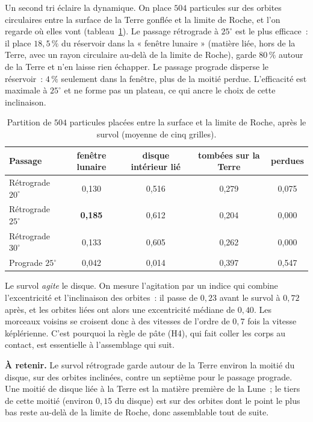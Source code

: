\documentclass[11pt,a4paper]{article}
\begin{document}
Un second tri éclaire la dynamique. On place $504$ particules sur des orbites circulaires entre la surface de la Terre gonflée et la limite de Roche, et l'on regarde où elles vont (tableau~\ref{tab:504}). Le passage rétrograde à $25^\circ$ est le plus efficace~: il place $18{,}5\,\%$ du réservoir dans la « fenêtre lunaire » (matière liée, hors de la Terre, avec un rayon circulaire au-delà de la limite de Roche), garde $80\,\%$ autour de la Terre et n'en laisse rien échapper. Le passage prograde disperse le réservoir~: $4\,\%$ seulement dans la fenêtre, plus de la moitié perdue. L'efficacité est maximale à $25^\circ$ et ne forme pas un plateau, ce qui ancre le choix de cette inclinaison.

\begin{table}[htbp]
\centering
\caption{Partition de $504$ particules placées entre la surface et la limite de Roche, après le survol (moyenne de cinq grilles).\label{tab:504}}
\small
\begin{tabular}{lcccc}
\toprule
Passage & fenêtre lunaire & disque intérieur lié & tombées sur la Terre & perdues \\
\midrule
Rétrograde $20^\circ$ & 0,130 & 0,516 & 0,279 & 0,075 \\
Rétrograde $25^\circ$ & \textbf{0,185} & 0,612 & 0,204 & 0,000 \\
Rétrograde $30^\circ$ & 0,133 & 0,605 & 0,262 & 0,000 \\
Prograde $25^\circ$ & 0,042 & 0,014 & 0,397 & 0,547 \\
\bottomrule
\end{tabular}
\end{table}

Le survol \emph{agite} le disque. On mesure l'agitation par un indice qui combine l'excentricité et l'inclinaison des orbites~: il passe de $0{,}23$ avant le survol à $0{,}72$ après, et les orbites liées ont alors une excentricité médiane de $0{,}40$. Les morceaux voisins se croisent donc à des vitesses de l'ordre de $0{,}7$ fois la vitesse képlérienne. C'est pourquoi la règle de pâte (H4), qui fait coller les corps au contact, est essentielle à l'assemblage qui suit.

\textbf{À retenir.} Le survol rétrograde garde autour de la Terre environ la moitié du disque, sur des orbites inclinées, contre un septième pour le passage prograde. Une moitié de disque liée à la Terre est la matière première de la Lune~; le tiers de cette moitié (environ $0{,}15$ du disque) est sur des orbites dont le point le plus bas reste au-delà de la limite de Roche, donc assemblable tout de suite.
\end{document}
